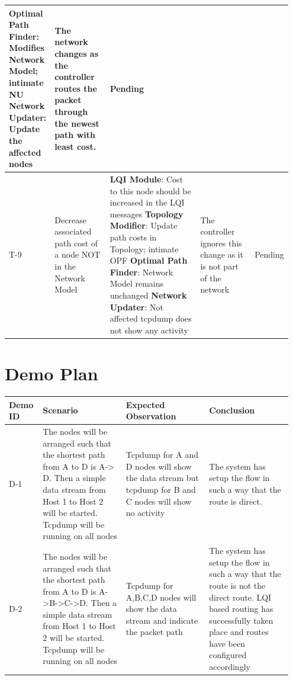 \documentclass{article}
\begin{document}
{\begin{longtable}{  | p{0.1\linewidth} | p{0.2\linewidth} | p{0.35\linewidth} | p{0.2\linewidth} | p{0.1\linewidth} | }
\textbf{Optimal Path Finder}: Modifies Network Model; intimate NU\newline
\textbf{Network Updater}: Update the affected nodes \newline &
The network changes as the controller routes the packet through the newest path with least cost. &
Pending\\
\hline
T-9 & 
Decrease associated path cost of a node NOT in the Network Model & 
\textbf{LQI Module}: Cost to this node should be increased in the LQI messages\newline 
\textbf{Topology Modifier}: Update path costs in Topology; intimate OPF\newline 
\textbf{Optimal Path Finder}: Network Model remains unchanged\newline
\textbf{Network Updater}: Not affected\newline
tcpdump does not show any activity &
The controller ignores this change as it is not part of the network &
Pending\\
\hline
\end{longtable}}
\section{Demo Plan}
{\renewcommand{\arraystretch}{1.5}
\begin{tabular}{ | p{0.095\linewidth} | p{0.285\linewidth} | p{0.285\linewidth} | p{0.285\linewidth} | }
\hline
\textbf{Demo ID}	&	\textbf{Scenario}	&	\textbf{Expected Observation}	&	\textbf{Conclusion}	\\ 
\hline \hline
D-1 & The nodes will be arranged such that the shortest path from A to D is A-> D. Then a simple data stream from Host 1
to Host 2 will be started. Tcpdump will be running on all nodes & Tcpdump for A and D nodes will show the data stream
but tcpdump for B and C nodes will show no activity & The system has setup the flow in such a way that the route is
direct. \\
\hline
D-2 & The nodes will be arranged such that the shortest path from A to D is A->B->C->D. Then a simple data stream from
Host 1 to Host 2 will be started. Tcpdump will be running on all nodes & Tcpdump for A,B,C,D nodes will show the data
stream and indicate the packet path & The system has setup the flow in such a way that the route is not the direct
route. LQI based routing has successfully taken place and routes have been configured accordingly \\
\hline
\end{tabular}}
\end{document}
